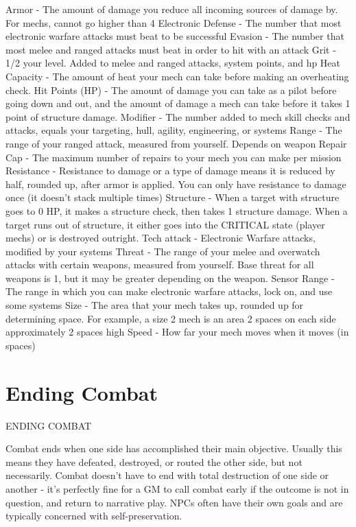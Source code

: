 Armor - The amount of damage you reduce all incoming sources of damage by. For mechs,
cannot go higher than 4
Electronic Defense - The number that most electronic warfare attacks must beat to be
successful
Evasion - The number that most melee and ranged attacks must beat in order to hit with an
attack
Grit - 1/2 your level. Added to melee and ranged attacks, system points, and hp
Heat Capacity - The amount of heat your mech can take before making an overheating check.
Hit Points (HP) - The amount of damage you can take as a pilot before going down and out, and
the amount of damage a mech can take before it takes 1 point of structure damage.
Modifier - The number added to mech skill checks and attacks, equals your targeting, hull, agility,
engineering, or systems
Range - The range of your ranged attack, measured from yourself. Depends on weapon
Repair Cap - The maximum number of repairs to your mech you can make per mission
Resistance - Resistance to damage or a type of damage means it is reduced by half, rounded up,
after armor is applied. You can only have resistance to damage once (it doesn’t stack multiple
times)
Structure - When a target with structure goes to 0 HP, it makes a structure check, then takes 1
structure damage. When a target runs out of structure, it either goes into the CRITICAL state
(player mechs) or is destroyed outright.
Tech attack - Electronic Warfare attacks, modified by your systems
Threat - The range of your melee and overwatch attacks with certain weapons, measured from
yourself. Base threat for all weapons is 1, but it may be greater depending on the weapon.
Sensor Range - The range in which you can make electronic warfare attacks, lock on, and use
some systems
Size - The area that your mech takes up, rounded up for determining space. For example, a size
2 mech is an area 2 spaces on each side approximately 2 spaces high
Speed - How far your mech moves when it moves (in spaces)


\chapter{Ending Combat}

                                           ENDING COMBAT


Combat ends when one side has accomplished their main objective. Usually this means they
have defeated, destroyed, or routed the other side, but not necessarily. Combat doesn’t have to
end with total destruction of one side or another - it’s perfectly fine for a GM to call combat early
if the outcome is not in question, and return to narrative play. NPCs often have their own goals
and are typically concerned with self-preservation.
